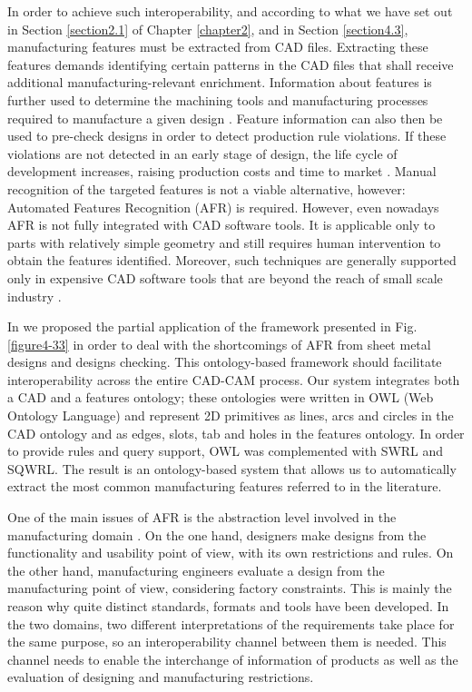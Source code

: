 In order to achieve such interoperability, and according to what we have set out in Section \ref{section2.1} of Chapter \ref{chapter2}, and in Section \ref{section4.3}, manufacturing features must be extracted from CAD files.  Extracting these features demands identifying certain patterns in the CAD files that shall receive additional manufacturing-relevant enrichment.  Information about features is further used to determine the machining tools and manufacturing processes required to manufacture a given design \citep{cayiroglu_new_2009}. Feature information can also then be used to pre-check designs in order to detect production rule violations. If these violations are not detected in an early stage of design, the life cycle of development increases, raising production costs and time to market \citep{radhakrishnan_design_1996}. Manual recognition of the targeted features is not a viable alternative, however: Automated Features Recognition (AFR) is required. However, even nowadays AFR is not fully integrated with CAD software tools. It is applicable only to parts with relatively simple geometry and still requires human intervention to obtain the features identified. Moreover, such techniques are generally supported only in expensive CAD software tools that are beyond the reach of small scale industry \citep{kumar_trends_2005}. 


In \cite{ramos_ontology-based_2011}   we proposed the partial application of the framework presented in Fig. \ref{figure4-33} in order to deal with the shortcomings of AFR from sheet metal designs and designs checking. This ontology-based framework should facilitate interoperability across the entire CAD-CAM process. Our system integrates both a CAD and a features ontology; these ontologies were written in OWL (Web Ontology Language) and represent 2D primitives as lines, arcs and circles in the CAD ontology and as edges, slots, tab and holes in the features ontology. In order to provide rules and query support, OWL was complemented with SWRL and SQWRL. The result is an ontology-based system that allows us to automatically extract the most common manufacturing features referred to in the literature.


One of the main issues of AFR is the abstraction level involved in the manufacturing domain \citep{shah_functional_1988}. On the one hand, designers make designs from the functionality and usability point of view, with its own restrictions and rules. On the other hand, manufacturing engineers evaluate a design from the manufacturing point of view, considering factory constraints. This is mainly the reason why quite distinct standards, formats and tools have been developed. In the two domains, two different interpretations of the requirements take place for the same purpose, so an interoperability channel between them is needed.  This channel needs to enable the interchange of information of products as well as the evaluation of designing and manufacturing restrictions. 

